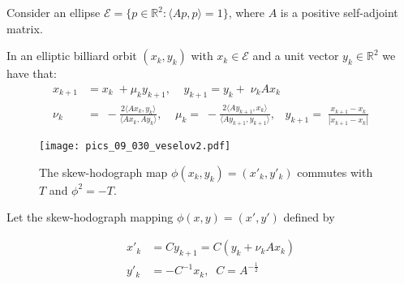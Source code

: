 Consider an ellipse $\mathcal{E}=\{p\in \mathbb{R}^2:  \langle Ap,p\rangle=1\}$, where  $A$ is a positive  self-adjoint matrix.

In an elliptic billiard orbit $ (x_k,y_k)$ with $x_k\in\mathcal{E}$ and a unit vector $y_k\in \mathbb{R}^2$ we have that:
\begin{align*}
	x_{k+1} &=x_k\;+\mu_k y_{k+1},\;\;\;\;
	y_{k+1} =y_k+\; \nu_k Ax_{k}\\
	\nu_k &=\;-\frac{2\langle Ax_k,y_k\rangle}{\langle Ax_{k},Ay_{k}\rangle},\;\;\;\;
	\mu_k  =\;-\frac{2\langle Ay_{k+1},x_k\rangle}{\langle Ay_{k+1},y_{k+1}\rangle},\;\;\;
	y_{k+1}  =\;\frac{x_{k+1}-x_k}{|x_{k+1}-x_k|}
\end{align*}
\begin{figure} 
\begin{center}
\texttt{[image: pics\_09\_030\_veselov2.pdf]}
\caption{The skew-hodograph map $\phi(x_k,y_k)=(x'_k,y'_k)$ commutes with $T$ and $\phi^2=-T$.}
\end{center}
\end{figure}
   
 
 

Let the skew-hodograph mapping $\phi(x,y)=(x',y')$ defined by

\begin{align}
    x'_k&=Cy_{k+1}=C(y_k+\nu_k Ax_k)\nonumber \\
    y'_k&=-C^{-1}x_k, \;\; C=A^{-\frac{1}{2}}
    \label{eq:hodrog}
\end{align}

